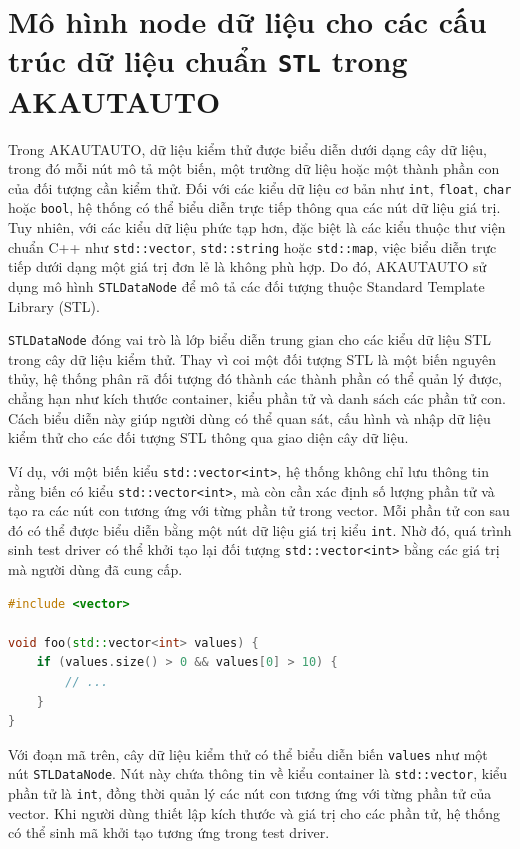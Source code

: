 \section{Mô hình node dữ liệu cho các cấu trúc dữ liệu chuẩn \texttt{STL} trong AKAUTAUTO}

Trong AKAUTAUTO, dữ liệu kiểm thử được biểu diễn dưới dạng cây dữ liệu, trong đó mỗi nút mô tả một biến, một trường dữ liệu hoặc một thành phần con của đối tượng cần kiểm thử. Đối với các kiểu dữ liệu cơ bản như \texttt{int}, \texttt{float}, \texttt{char} hoặc \texttt{bool}, hệ thống có thể biểu diễn trực tiếp thông qua các nút dữ liệu giá trị. Tuy nhiên, với các kiểu dữ liệu phức tạp hơn, đặc biệt là các kiểu thuộc thư viện chuẩn C++ như \texttt{std::vector}, \texttt{std::string} hoặc \texttt{std::map}, việc biểu diễn trực tiếp dưới dạng một giá trị đơn lẻ là không phù hợp. Do đó, AKAUTAUTO sử dụng mô hình \texttt{STLDataNode} để mô tả các đối tượng thuộc Standard Template Library (STL).

\texttt{STLDataNode} đóng vai trò là lớp biểu diễn trung gian cho các kiểu dữ liệu STL trong cây dữ liệu kiểm thử. Thay vì coi một đối tượng STL là một biến nguyên thủy, hệ thống phân rã đối tượng đó thành các thành phần có thể quản lý được, chẳng hạn như kích thước container, kiểu phần tử và danh sách các phần tử con. Cách biểu diễn này giúp người dùng có thể quan sát, cấu hình và nhập dữ liệu kiểm thử cho các đối tượng STL thông qua giao diện cây dữ liệu.

Ví dụ, với một biến kiểu \texttt{std::vector<int>}, hệ thống không chỉ lưu thông tin rằng biến có kiểu \texttt{std::vector<int>}, mà còn cần xác định số lượng phần tử và tạo ra các nút con tương ứng với từng phần tử trong vector. Mỗi phần tử con sau đó có thể được biểu diễn bằng một nút dữ liệu giá trị kiểu \texttt{int}. Nhờ đó, quá trình sinh test driver có thể khởi tạo lại đối tượng \texttt{std::vector<int>} bằng các giá trị mà người dùng đã cung cấp.

\begin{lstlisting}[language=C++,caption={Ví dụ khai báo đối tượng STL},label={lst:stl_vector_example}]
#include <vector>

void foo(std::vector<int> values) {
    if (values.size() > 0 && values[0] > 10) {
        // ...
    }
}
\end{lstlisting}

Với đoạn mã trên, cây dữ liệu kiểm thử có thể biểu diễn biến \texttt{values} như một nút \texttt{STLDataNode}. Nút này chứa thông tin về kiểu container là \texttt{std::vector}, kiểu phần tử là \texttt{int}, đồng thời quản lý các nút con tương ứng với từng phần tử của vector. Khi người dùng thiết lập kích thước và giá trị cho các phần tử, hệ thống có thể sinh mã khởi tạo tương ứng trong test driver.

